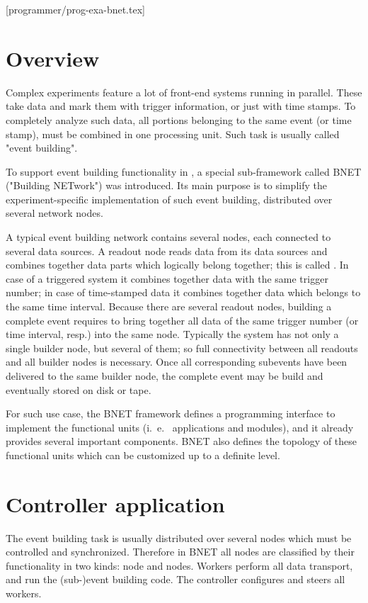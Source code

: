 [programmer/prog-exa-bnet.tex]
\label{prog_exabnet}
\section{Overview}

Complex experiments feature a lot of front-end systems running in parallel.
These take data and mark them with trigger information, or just with time stamps.
To completely analyze such data, all portions belonging to the same event 
(or time stamp), must be combined in one processing unit. 
Such task is usually called "event building".

To support event building functionality in \dabc, a special sub-framework called 
BNET ("Building NETwork") was introduced. 
Its main purpose is to simplify the experiment-specific implementation of  
such event building, distributed over several network nodes.

A typical event building network contains several  nodes, 
each connected to several data sources.
A readout node reads data from its data sources and combines
together data parts which logically belong together; this is called .
In case of a triggered system it combines together data with the same trigger number;
in case of time-stamped data it combines together data which belongs to the same 
time interval. 
Because there are several readout nodes, building a complete event requires to 
bring together all data of the same trigger number (or time interval, resp.) 
into the same  node. 
Typically the system has not only a single builder node, 
but several of them; so full connectivity between all readouts and 
all builder nodes is necessary.
Once all corresponding subevents have been delivered to the same builder node, 
the complete event may be build and eventually stored on disk or tape. 

For such use case,
the BNET framework defines a programming interface 
to implement the functional units (i.~e.~ applications and modules), 
and it already provides several important components.
BNET also defines the topology of these functional units
which can be customized up to a definite level.


\section{Controller application}

The event building task is usually distributed over several nodes 
which must be controlled and synchronized.
Therefore in BNET all nodes are classified by their functionality 
in two kinds:  node and
 nodes. Workers perform all 
data transport, and run the (sub-)event building code. 
The controller configures and steers all workers. 

